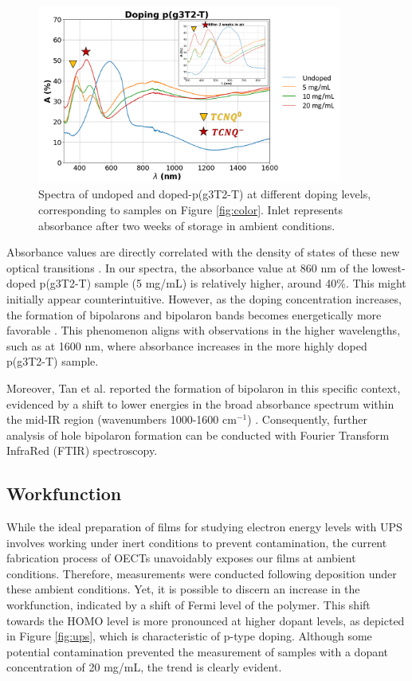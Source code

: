 \begin{figure}[ht]
  \centering
  \includegraphics[width=10cm]{Images/pdf/abs+inlet.pdf}
  \caption[Absorbance spectra of different doping levels of p(g3T2-T)]{Spectra of undoped and doped-p(g3T2-T) at different doping levels, corresponding to samples on Figure \ref{fig:color}. Inlet represents absorbance after two weeks of storage in ambient conditions.}
  \label{fig:abs}
\end{figure}

Absorbance values are directly correlated with the density of states of these new optical transitions \cite{bredasPolaronsBipolaronsSolitons1985}. In our spectra, the absorbance value at 860 nm of the lowest-doped p(g3T2-T) sample (5 mg/mL) is relatively higher, around 40\%. This might initially appear counterintuitive. However, as the doping concentration increases, the formation of bipolarons and bipolaron bands becomes energetically more favorable \cite{enenglDopinginducedAbsorptionBands2016} . This phenomenon aligns with observations in the higher wavelengths, such as at 1600 nm, where absorbance increases in the more highly doped p(g3T2-T) sample.

Moreover, Tan et al. reported the formation of bipolaron in this specific context, evidenced by a shift to lower energies in the broad absorbance spectrum within the mid-IR region (wavenumbers 1000-1600 cm$^{-1}$) \cite{tanTuningOrganicElectrochemical2022}. Consequently, further analysis of hole bipolaron formation can be conducted with Fourier Transform InfraRed (FTIR) spectroscopy.
 
\subsection{Workfunction}

While the ideal preparation of films for studying electron energy levels with UPS involves working under inert conditions to prevent contamination, the current fabrication process of OECTs unavoidably exposes our films at ambient conditions. Therefore, measurements were conducted following deposition under these ambient conditions. Yet, it is possible to discern an increase in the workfunction, indicated by a shift of Fermi level of the polymer. This shift towards the HOMO level is more pronounced at higher dopant levels, as depicted in Figure \ref{fig:ups}, which is characteristic of p-type doping. Although some potential contamination prevented the measurement of samples with a dopant concentration of 20 mg/mL, the trend is clearly evident.

